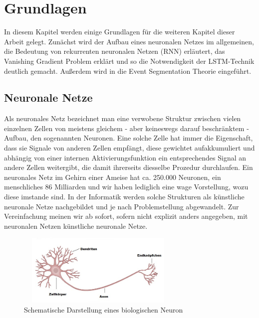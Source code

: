 \chapter{Grundlagen} 
\label{ch:grundlagen}
In diesem Kapitel werden einige Grundlagen für die weiteren Kapitel dieser Arbeit gelegt. Zunächst wird der Aufbau eines neuronalen Netzes im allgemeinen, die Bedeutung von rekurrenten neuronalen Netzen (RNN) erläutert, das Vanishing Gradient Problem  erklärt und so die Notwendigkeit der LSTM-Technik deutlich gemacht. Außerdem wird in die Event Segmentation Theorie eingeführt.
\section{Neuronale Netze}
Als neuronales Netz bezeichnet man eine verwobene Struktur zwischen vielen einzelnen Zellen von meistens gleichem - aber keineswegs darauf beschr\"anktem - Aufbau, den sogenannten Neuronen. Eine solche Zelle hat immer die Eigenschaft, dass sie Signale von anderen Zellen empfängt, diese gewichtet aufakkumuliert und abhängig von einer internen Aktivierungsfunktion ein entsprechendes Signal an andere Zellen weitergibt, die damit ihrerseits diesselbe Prozedur durchlaufen. Ein neuronales Netz im Gehirn einer Ameise hat ca. 250.000 Neuronen, ein menschliches 86 Milliarden \cite{bib:number} und wir haben lediglich eine wage Vorstellung, wozu diese imstande sind. In der Informatik werden solche Strukturen als künstliche neuronale Netze nachgebildet und je nach Problemstellung abgewandelt. Zur Vereinfachung meinen wir ab sofort, sofern nicht explizit anders angegeben, mit neuronalen Netzen künstliche neuronale Netze.
\begin{figure}
	\centering
	\includegraphics[width=0.7\textwidth, height=130px]{pics/neuron.jpg}	
	\caption{Schematische Darstellung eines biologischen Neuron \cite{bib:neuron}}
	\label{img:neuron}
\end{figure}
